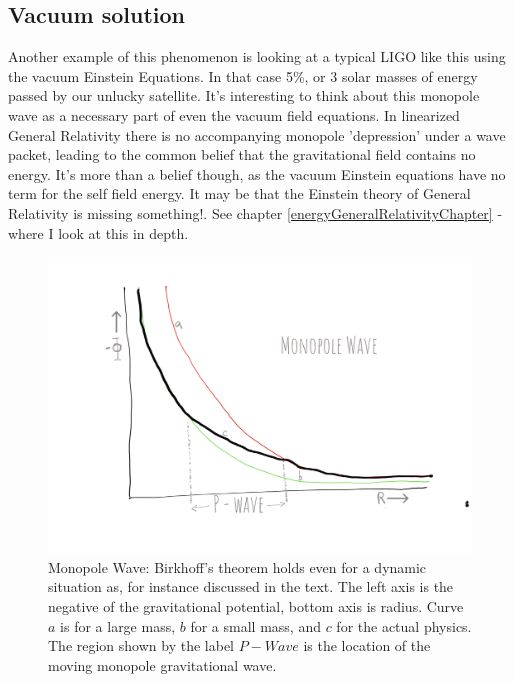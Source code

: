 \documentclass[../rzero]{subfiles}
\begin{document}
\subsection{Vacuum solution}
Another example of this phenomenon is looking at a typical LIGO\cite{collaborationGW150914FirstResults2016} like this using the vacuum Einstein Equations. In that case 5\%, or 3 solar masses of energy passed by our unlucky satellite. It's interesting to think about this monopole wave as a necessary part of even the vacuum field equations. In linearized General Relativity there is no accompanying monopole 'depression' under a wave packet, leading to the common belief that the gravitational field contains no energy. It's more than a belief though, as the vacuum Einstein equations have no term for the self field energy. It may be that the Einstein theory of General Relativity is missing something!\cite{08092323EnergyMomentumGravitational}. See chapter \ref{energyGeneralRelativityChapter} - where I look at this in depth. 

\begin{figure}\label{monopoleFigure}
\includegraphics[width=\textwidth]{chapters/images/monopole.png}
\caption{Monopole Wave: Birkhoff's theorem holds even for a dynamic situation as, for instance discussed in the text. The left axis is the negative of the gravitational potential, bottom axis is radius. Curve $a$ is for a large mass, $b$ for a small mass, and $c$ for the actual physics. The region shown by the label $P - Wave$ is the location of the moving monopole gravitational wave.}
\end{figure}
\end{document}
